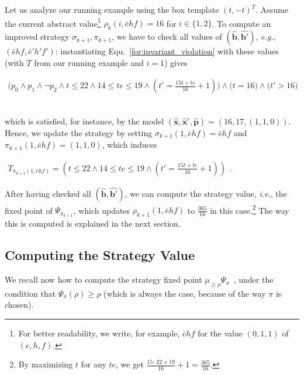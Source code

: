 \documentclass{llncs}
\newcommand{\instance}[1]{\hat{#1}}
\newcommand{\ie}{\textit{i.e.}}
\newcommand{\eg}{\textit{e.g.}}
\renewcommand{\vec}[1]{{\boldsymbol #1}}
\newcommand{\verr}{\mathit{e}} \newcommand{\vheat}{\mathit{h}} \newcommand{\vfan}{\mathit{f}}
\begin{document}
\begin{example*}
Let us analyze our running example using the box template $(t,-t)^T$.
Assume the current abstract value\footnote{For better readability, we write,
for example, $\bar{\verr}\vheat\vfan$ for
the value $(0,1,1)$ of $(\verr,\vheat,\vfan)$.} 
$\rho_k(i,\bar{\verr}\vheat\vfan)=16$ for $i\in\{1,2\}$.
To compute an improved strategy $\sigma_{k+1},\pi_{k+1}$, we have to check all values of
$(\instance{\vec{b}},\instance{\vec{b}'})$, \eg, 
$(\bar{\verr}\vheat\vfan,\bar{\verr}'\vheat'\vfan')$:
 instantiating Equ.~\ref{for:invariant_violation} with these values
 (with $T$ from our running example and $i=1$) gives\\[0.6ex]
\centerline{\small
$\begin{array}{c}
  \big(p_0 \wedge p_1 \wedge \neg p_2
\wedge
  t\leq 22 \wedge 14\leq te\leq 19 \wedge (t' = \frac{15t+te}{16}+1)\big)
\wedge 
\big(t=16\big) 
\wedge
\big(t'>16\big)
\end{array}
$}\\[0.6ex]
which is satisfied, for instance, by the model
$(\instance{\vec{x}},\instance{\vec{x}}',\instance{\vec{p}})=(16,17,(1,1,0))$.  Hence, we
update the strategy by setting $\sigma_{k+1}(1,\bar{\verr}\vheat\vfan)=\bar{\verr}\vheat\vfan$
and \\ $\pi_{k+1}(1,\bar{\verr}\vheat\vfan)=(1,1,0)$,
which induces\\[0.6ex]
\centerline{\small $
\begin{array}{c}
T_{\pi_{k+1}(1,\bar{\verr}\vheat\vfan)} = (t\leq 22 \wedge 14\leq
te\leq 19 \wedge (t' = \frac{15t+te}{16}+1))
\end{array}.
$ }

After having checked all $(\instance{\vec{b}},\instance{\vec{b}'})$,
we can compute the strategy value, \ie, 
the fixed point of $\Psi_{\pi_{k+1}}$, which updates
$\rho_{k+1}(1,\bar{\verr}\vheat\vfan)$ to
$\frac{365}{16}$ in this case.\footnote{By maximizing $t$ for any $te$, we get
  $\frac{15\cdot 22+19}{16}+1=\frac{365}{16}$.}  The way this is
computed is explained in the next section.
\end{example*}


\subsection{Computing the Strategy Value}
\label{sec:original_value}
We recall now how to compute the strategy fixed point $\mu_{\geq \rho}
\Psi_{\pi}$~\cite[\S6.4]{Gawlitza_Monniaux_LMCS12}, under the
condition that $\Psi_\pi(\rho) \geq \rho$ (which is always the case,
because of the way $\pi$ is chosen).
\end{document}
